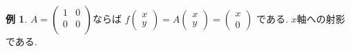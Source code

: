 \documentclass[dvipdfmx,a4paper,11pt]{article}
\theoremstyle{definition}
\newtheorem{exa}[thm]{例}
\begin{document}
  \begin{exa}
$
A=\begin{pmatrix}
1& 0 \\
0& 0 \\
\end{pmatrix}
$ならば
$
f\begin{pmatrix}
x \\ y
 \end{pmatrix} 
 =
 A
\begin{pmatrix}
x \\ y
 \end{pmatrix}  = 
 \begin{pmatrix}
x \\0
 \end{pmatrix}
$
である. $x$軸への射影である.  
\end{exa}



 
 
\end{document}
